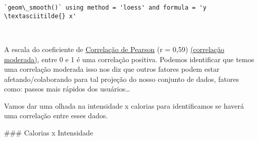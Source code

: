 \documentclass[11pt]{article}
\begin{document}
\begin{Verbatim}[commandchars=\\\{\}]
    `geom\_smooth()` using method = 'loess' and formula = 'y \textasciitilde{} x'
\end{Verbatim}

\begin{center}
\end{center}
{ \hspace*{\fill} \\}

A escala do coeficiente de
\href{https://www.scribbr.com/statistics/pearson-correlation-coefficient/}{Correlação
    de Pearson} (r = 0,59)
\href{https://www.researchgate.net/figure/The-scale-of-Pearsons-Correlation-Coefficient_tbl1_345693737}{(correlação
    moderada)}, entre 0 e 1 é uma correlação positiva. Podemos identificar
que temos uma correlação moderada isso nos diz que outros fatores podem
estar afetando/colaborando para tal projeção do nosso conjunto de dados,
fatores como: passos mais rápidos dos usuários\ldots{}

Vamos dar uma olhada na intensidade x calorias para identificamos se
haverá uma correlação entre esses dados.

\#\#\# Calorias x Intensidade
\end{document}
